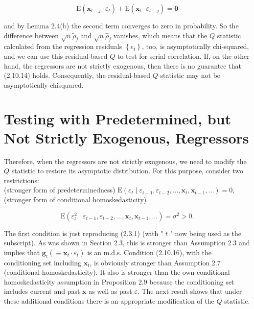 \documentclass[10pt]{article}
\begin{document}
\begin{equation*}
\mathrm{E}\left(\mathbf{x}_{t-j} \cdot \varepsilon_{t}\right)+\mathrm{E}\left(\mathbf{x}_{t} \cdot \varepsilon_{t-j}\right)=\mathbf{0} \tag{2.10.14}
\end{equation*}


and by Lemma 2.4(b) the second term converges to zero in probability. So the difference between $\sqrt{n} \tilde{\rho}_{j}$ and $\sqrt{n} \hat{\rho}_{j}$ vanishes, which means that the $Q$ statistic calculated from the regression residuals $\left\{e_{t}\right\}$, too, is asymptotically chi-squared, and we can use this residual-based $Q$ to test for serial correlation. If, on the other hand, the regressors are not strictly exogenous, then there is no guarantee that (2.10.14) holds. Consequently, the residual-based $Q$ statistic may not be asymptotically chisquared.

\section*{Testing with Predetermined, but Not Strictly Exogenous, Regressors}
Therefore, when the regressors are not strictly exogenous, we need to modify the $Q$ statistic to restore its asymptotic distribution. For this purpose, consider two restrictions:\\
(stronger form of predeterminedness) $\mathrm{E}\left(\varepsilon_{t} \mid \varepsilon_{t-1}, \varepsilon_{t-2}, \ldots, \mathbf{x}_{t}, \mathbf{x}_{t-1}, \ldots\right)=0$,\\
(stronger form of conditional homoskedasticity)


\begin{equation*}
\mathrm{E}\left(\varepsilon_{t}^{2} \mid \varepsilon_{t-1}, \varepsilon_{t-2}, \ldots, \mathbf{x}_{t}, \mathbf{x}_{t-1}, \ldots\right)=\sigma^{2}>0 . \tag{2.10.16}
\end{equation*}


The first condition is just reproducing (2.3.1) (with " $t$ " now being used as the subscript). As was shown in Section 2.3, this is stronger than Assumption 2.3 and implies that $\mathbf{g}_{t}\left(\equiv \mathbf{x}_{t} \cdot \varepsilon_{t}\right)$ is an m.d.s. Condition (2.10.16), with the conditioning set including $\mathbf{x}_{t}$, is obviously stronger than Assumption 2.7 (conditional homoskedasticity). It also is stronger than the own conditional homoskedasticity assumption in Proposition 2.9 because the conditioning set includes current and past $\mathbf{x}$ as well as past $\varepsilon$. The next result shows that under these additional conditions there is an appropriate modification of the $Q$ statistic.
\end{document}
